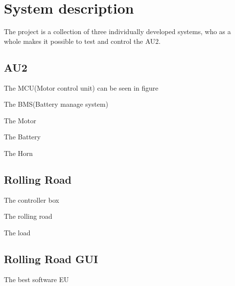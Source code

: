 \chapter{System description}


The project is a collection of three individually developed systems, who as a whole makes it possible to test and control the AU2.

\section{AU2}

The MCU(Motor control unit) can be seen in figure

The BMS(Battery manage system)

The Motor

The Battery

The Horn


\section{Rolling Road}

The controller box

The rolling road

The load

\section{Rolling Road GUI}

The best software EU